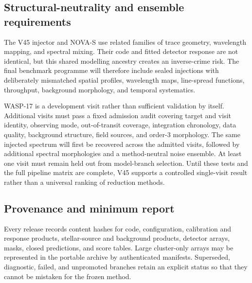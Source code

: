 \subsection{Structural-neutrality and ensemble requirements}

The V45 injector and NOVA-S use related families of trace geometry, wavelength
mapping, and spectral mixing. Their code and fitted detector response are not
identical, but this shared modelling ancestry creates an inverse-crime risk.
The final benchmark programme will therefore include sealed injections with
deliberately mismatched spatial profiles, wavelength maps, line-spread
functions, throughput, background morphology, and temporal systematics.

WASP-17 is a development visit rather than sufficient validation by itself.
Additional visits must pass a fixed admission audit covering target and visit
identity, observing mode, out-of-transit coverage, integration chronology,
data quality, background structure, field sources, and order-3 morphology.
The same injected spectrum will first be recovered across the admitted visits,
followed by additional spectral morphologies and a method-neutral noise
ensemble. At least one visit must remain held out from model-branch selection.
Until these tests and the full pipeline matrix are complete, V45 supports a
controlled single-visit result rather than a universal ranking of reduction
methods.

\subsection{Provenance and minimum report}

Every release records content hashes for code, configuration, calibration and
response products, stellar-source and background products, detector arrays,
masks, closed predictions, and score tables. Large cluster-only arrays may be
represented in the portable archive by authenticated manifests. Superseded,
diagnostic, failed, and unpromoted branches retain an explicit status so that
they cannot be mistaken for the frozen method.


